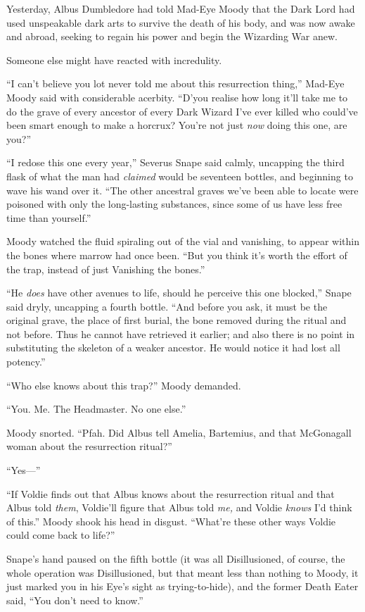 Yesterday, Albus Dumbledore had told Mad-Eye Moody that the Dark Lord
had used unspeakable dark arts to survive the death of his body, and was
now awake and abroad, seeking to regain his power and begin the
Wizarding War anew.

Someone else might have reacted with incredulity.

``I can't believe you lot never told me about this resurrection thing,''
Mad-Eye Moody said with considerable acerbity. ``D'you realise how long
it'll take me to do the grave of every ancestor of every Dark Wizard
I've ever killed who could've been smart enough to make a horcrux?
You're not just \emph{now} doing this one, are you?''

``I redose this one every year,'' Severus Snape said calmly, uncapping
the third flask of what the man had \emph{claimed} would be seventeen
bottles, and beginning to wave his wand over it. ``The other ancestral
graves we've been able to locate were poisoned with only the
long-lasting substances, since some of us have less free time than
yourself.''

Moody watched the fluid spiraling out of the vial and vanishing, to
appear within the bones where marrow had once been. ``But you think it's
worth the effort of the trap, instead of just Vanishing the bones.''

``He \emph{does} have other avenues to life, should he perceive this one
blocked,'' Snape said dryly, uncapping a fourth bottle. ``And before you
ask, it must be the original grave, the place of first burial, the bone
removed during the ritual and not before. Thus he cannot have retrieved
it earlier; and also there is no point in substituting the skeleton of a
weaker ancestor. He would notice it had lost all potency.''

``Who else knows about this trap?'' Moody demanded.

``You. Me. The Headmaster. No one else.''

Moody snorted. ``Pfah. Did Albus tell Amelia, Bartemius, and that
McGonagall woman about the resurrection ritual?''

``Yes---''

``If Voldie finds out that Albus knows about the resurrection ritual and
that Albus told \emph{them}, Voldie'll figure that Albus told \emph{me,}
and Voldie \emph{knows} I'd think of this.'' Moody shook his head in
disgust. ``What're these other ways Voldie could come back to life?''

Snape's hand paused on the fifth bottle (it was all Disillusioned, of
course, the whole operation was Disillusioned, but that meant less than
nothing to Moody, it just marked you in his Eye's sight as
trying-to-hide), and the former Death Eater said, ``You don't need to
know.''

